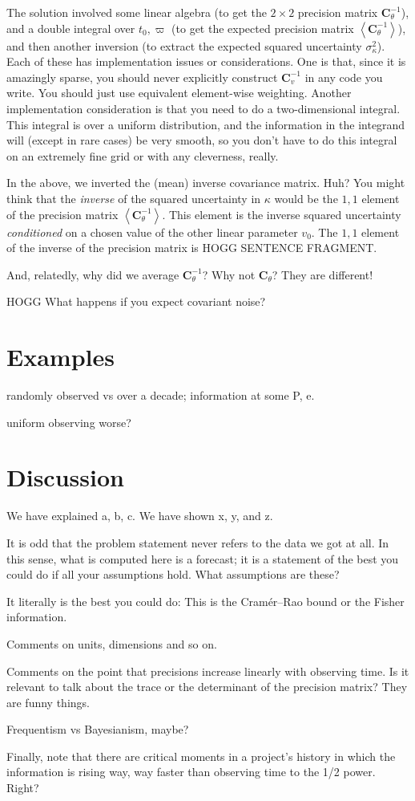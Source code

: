 \documentclass[10pt, letterpaper]{article}
\newcommand{\inv}{^{-1}}
\newcommand{\mean}[1]{\left<{#1}\right>}
\newcommand{\tensor}[1]{\mathbf{#1}}
\newcommand{\tC}{\tensor{C}}
\begin{document}
The solution involved some linear algebra (to get the $2\times 2$
precision matrix $\tC_\theta\inv$), and a double integral over $t_0,
\varpi$ (to get the expected precision matrix
$\mean{\tC_\theta\inv}$), and then another inversion (to extract the
expected squared uncertainty $\sigma^2_\kappa$). Each of these has
implementation issues or considerations. One is that, since it
is amazingly sparse, you should never explicitly construct $\tC_v\inv$
in any code you write. You should just use equivalent element-wise
weighting.
Another implementation consideration is that you need to do a two-dimensional
integral. This integral is over a uniform distribution, and the information
in the integrand will (except in rare cases) be very smooth, so you don't
have to do this integral on an extremely fine grid or with any cleverness,
really.

In the above, we inverted the (mean) inverse covariance matrix. Huh?
You might think that the \emph{inverse} of the squared uncertainty in $\kappa$ would be
the $1,1$ element of the precision matrix $\mean{\tC_\theta\inv}$.
This element is the inverse squared uncertainty \emph{conditioned} on
a chosen value of the other linear parameter $v_0$.
The $1,1$ element of the inverse of the precision matrix is HOGG SENTENCE FRAGMENT.

And, relatedly, why did we average $\tC_\theta\inv$? Why not $\tC_\theta$?
They are different!

HOGG What happens if you expect covariant noise?

\section{Examples}
randomly observed vs over a decade; information at some P, e.

uniform observing worse?

\section{Discussion}\label{sec:discussion}

We have explained a, b, c. We have shown x, y, and z.

It is odd that the problem statement never refers to the data we got at all.
In this sense, what is computed here is a forecast; it is a statement of the
best you could do if all your assumptions hold. What assumptions are these?

It literally is the best you could do:
This is the Cram\'er--Rao bound or the Fisher information.

Comments on units, dimensions and so on.

Comments on the point that precisions increase linearly with observing time.
Is it relevant to talk about the trace or the determinant of the precision
matrix? They are funny things.

Frequentism vs Bayesianism, maybe?

Finally, note that there are critical moments in a project's history in which
the information is rising way, way faster than observing time to the 1/2 power.
Right?

\clearmargin\clearpage\raggedright

\end{document}
